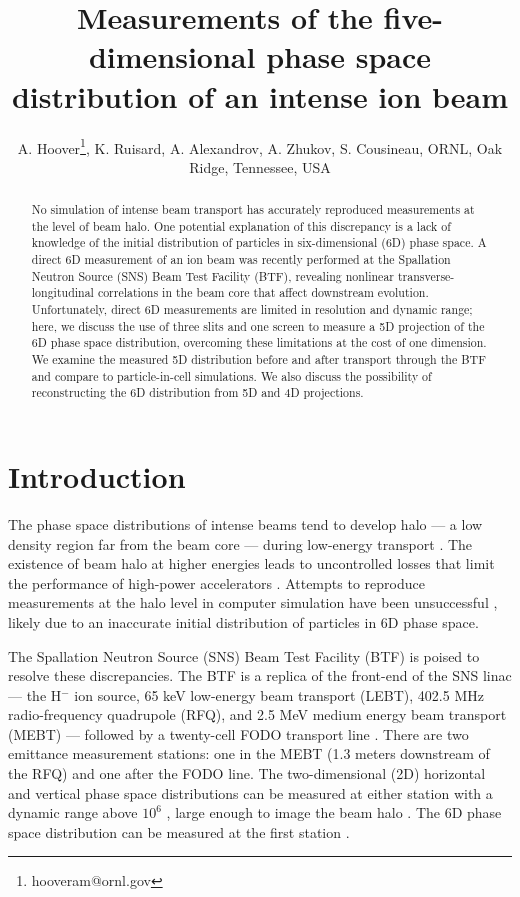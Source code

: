\documentclass[letterpaper,
               keeplastbox,
               nospread,
               biblatex,
              ]{jacow}
\begin{document}
\title{Measurements of the five-dimensional phase space distribution of an intense ion beam}

\author{A. Hoover\thanks{hooveram@ornl.gov}, K. Ruisard, A. Alexandrov, A. Zhukov, S. Cousineau, ORNL, Oak Ridge, Tennessee, USA}
	
\maketitle

%
\begin{abstract}
No simulation of intense beam transport has accurately reproduced measurements at the level of beam halo. One potential explanation of this discrepancy is a lack of knowledge of the initial distribution of particles in six-dimensional (6D) phase space. A direct 6D measurement of an ion beam was recently performed at the Spallation Neutron Source (SNS) Beam Test Facility (BTF), revealing nonlinear transverse-longitudinal correlations in the beam core that affect downstream evolution. Unfortunately, direct 6D measurements are limited in resolution and dynamic range; here, we discuss the use of three slits and one screen to measure a 5D projection of the 6D phase space distribution, overcoming these limitations at the cost of one dimension. We examine the measured 5D distribution before and after transport through the BTF and compare to particle-in-cell simulations. We also discuss the possibility of reconstructing the 6D distribution from 5D and 4D projections.
\end{abstract}

\section{Introduction}

The phase space distributions of intense beams tend to develop halo — a low density region far from the beam core — during low-energy transport \cite{Batygin2021}. The existence of beam halo at higher energies leads to uncontrolled losses that limit the performance of high-power accelerators \cite{Henderson2014}. Attempts to reproduce measurements at the halo level in computer simulation have been unsuccessful \cite{Allen2002, Qiang2002, Groening2008}, likely due to an inaccurate initial distribution of particles in 6D phase space.

The Spallation Neutron Source (SNS) Beam Test Facility (BTF) is poised to resolve these discrepancies. The BTF is a replica of the front-end of the SNS linac — the H$^-$ ion source, 65 keV low-energy beam transport (LEBT), 402.5 MHz radio-frequency quadrupole (RFQ), and 2.5 MeV medium energy beam transport (MEBT) — followed by a twenty-cell FODO transport line \cite{Zhang2020}. There are two emittance measurement stations: one in the MEBT (1.3 meters downstream of the RFQ) and one after the FODO line. The two-dimensional (2D) horizontal and vertical phase space distributions can be measured at either station with a dynamic range above $10^6$ \cite{Aleksandrov2021}, large enough to image the beam halo \cite{Aleksandrov2020}. The 6D phase space distribution can be measured at the first station \cite{Cathey2018}. 
\end{document}
